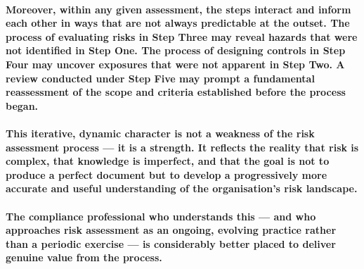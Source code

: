 \paragraph{Moreover, within any given assessment, the steps interact and inform each other in ways that are not always predictable at the outset. The process of evaluating risks in Step Three may reveal hazards that were not identified in Step One. The process of designing controls in Step Four may uncover exposures that were not apparent in Step Two. A review conducted under Step Five may prompt a fundamental reassessment of the scope and criteria established before the process began.}
\paragraph{This iterative, dynamic character is not a weakness of the risk assessment process — it is a strength. It reflects the reality that risk is complex, that knowledge is imperfect, and that the goal is not to produce a perfect document but to develop a progressively more accurate and useful understanding of the organisation's risk landscape.}
\paragraph{The compliance professional who understands this — and who approaches risk assessment as an ongoing, evolving practice rather than a periodic exercise — is considerably better placed to deliver genuine value from the process.}

\newpage

